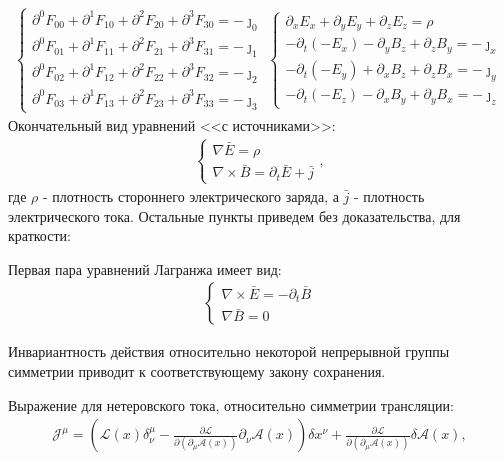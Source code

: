 \documentclass[__main__.tex]{subfiles}
\begin{document}
\begin{gather}
    \begin{cases}
        \partial^0F_{00}+\partial^1F_{10}+\partial^2F_{20}+\partial^3F_{30}=-\jmath_0 \\
        \partial^0F_{01}+\partial^1F_{11}+\partial^2F_{21}+\partial^3F_{31}=-\jmath_1 \\
        \partial^0F_{02}+\partial^1F_{12}+\partial^2F_{22}+\partial^3F_{32}=-\jmath_2 \\
        \partial^0F_{03}+\partial^1F_{13}+\partial^2F_{23}+\partial^3F_{33}=-\jmath_3
    \end{cases}
    \begin{cases}
        \partial_xE_x+\partial_yE_y+\partial_zE_z=\rho          \\
        -\partial_t(-E_x)-\partial_yB_z+\partial_zB_y=-\jmath_x \\
        -\partial_t(-E_y)+\partial_xB_z+\partial_zB_x=-\jmath_y \\
        -\partial_t(-E_z)-\partial_xB_y+\partial_yB_x=-\jmath_z
    \end{cases}
\end{gather}
Окончательный вид уравнений <<с источниками>>:\\
\begin{gather}
    \begin{cases}
        \nabla\bar{E}=\rho \\
        \nabla\times\bar{B}=\partial_t\bar{E}+\bar{j}
    \end{cases},
\end{gather}
где $\rho$ - плотность стороннего электрического заряда, а $\bar{j}$ - плотность электрического тока. Остальные пункты приведем без доказательства, для краткости:

Первая пара уравнений Лагранжа имеет вид:
\begin{gather}
    \begin{cases}
        \nabla\times\bar{E}=-\partial_t\bar{B} \\
        \nabla\bar{B}=0
    \end{cases}
\end{gather}

\begin{theorem}[Нётер]
    Инвариантность действия относительно некоторой непрерывной группы симметрии приводит к соответствующему закону сохранения.
\end{theorem}

Выражение для нетеровского тока, относительно симметрии трансляции:
\begin{gather}
    \mathcal{J}^\mu=\left(\mathcal{L}(x)\delta_\nu^\mu-\frac{\partial \mathcal{L}}{\partial (\partial_\mu\mathcal{A}(x))}\partial_\nu\mathcal{A}(x)\right)\delta x^\nu+\frac{\partial\mathcal{L}}{\partial(\partial_\mu\mathcal{A}(x))}\delta\mathcal{A}(x),
\end{gather}
\end{document}
